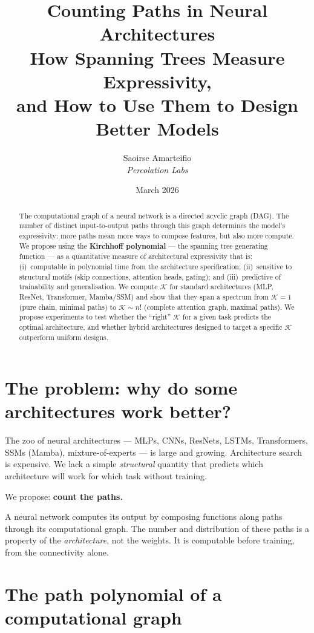 \documentclass[11pt,a4paper]{article}
\title{%
\textbf{Counting Paths in Neural Architectures}\\[0.4em]
\large How Spanning Trees Measure Expressivity,\\
and How to Use Them to Design Better Models
}
\author{Saoirse Amarteifio \\ \small\textit{Percolation Labs}}
\date{March 2026}
\newcommand{\K}{\mathcal{K}}
\begin{document}
\maketitle

\begin{abstract}
The computational graph of a neural network is a directed acyclic
graph (DAG). The number of distinct input-to-output paths through
this graph determines the model's expressivity: more paths mean
more ways to compose features, but also more compute. We propose
using the \textbf{Kirchhoff polynomial} --- the spanning tree
generating function --- as a quantitative measure of architectural
expressivity that is: (i)~computable in polynomial time from the
architecture specification; (ii)~sensitive to structural motifs
(skip connections, attention heads, gating); and (iii)~predictive
of trainability and generalisation. We compute $\K$ for standard
architectures (MLP, ResNet, Transformer, Mamba/SSM) and show that
they span a spectrum from $\K = 1$ (pure chain, minimal paths) to
$\K \sim n!$ (complete attention graph, maximal paths). We propose
experiments to test whether the ``right'' $\K$ for a given task
predicts the optimal architecture, and whether hybrid architectures
designed to target a specific $\K$ outperform uniform designs.
\end{abstract}

\tableofcontents


\section{The problem: why do some architectures work better?}

The zoo of neural architectures --- MLPs, CNNs, ResNets, LSTMs,
Transformers, SSMs (Mamba), mixture-of-experts --- is large and
growing.  Architecture search is expensive.  We lack a simple
\emph{structural} quantity that predicts which architecture will
work for which task without training.

We propose: \textbf{count the paths.}

A neural network computes its output by composing functions along
paths through its computational graph.  The number and distribution
of these paths is a property of the \emph{architecture}, not the
weights.  It is computable before training, from the connectivity
alone.


\section{The path polynomial of a computational graph}
\end{document}
